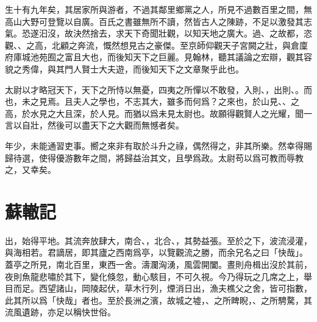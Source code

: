 生十有九{年}矣，其居家所與游者，不過其鄰里鄉黨之人，所見不過數百里之間，無高山大野可登覽以自廣。百氏之書雖無所不讀，然皆古人之陳跡，不足以激發其志氣。恐遂汩沒，故決然捨去，求天下奇聞壯觀，以知天地之廣大。過、之故都，恣觀、、之高，北顧之奔流，慨然想見古之豪傑。至京師仰觀天子宮闕之壯，與倉廩府庫城池苑囿之富且大也，而後知天下之巨麗。見翰林，聽其議論之宏辯，觀其容貌之秀偉，與其門人賢士大夫遊，而後知天下之文章聚乎此也。%

太尉以才略冠天下，天下之所恃以無憂，四夷之所憚以不敢發，入則、，出則、。而也，未之見焉。且夫人之學也，不志其大，雖多而何爲？之來也，於山見、、之高，於水見之大且深，於人見。而猶以爲未見太尉也。故願得觀賢人之光耀，聞一言以自壯，然後可以盡天下之大觀而無憾者矣。

年少，未能通習吏事。嚮之來非有取於斗升之祿，偶然得之，非其所樂。然幸得賜歸待選，使得優游數年之間，將{歸}益治其文，且學爲政。太尉苟以爲可教而辱教之，又幸矣。%
\nopagebreak
\theendnotes

\section[黃州快哉亭記\quad{\small 蘇轍}]{{\normalsize 蘇轍}\quad {}記}
出，始得平地。其流奔放肆大，南合、，北合、，其勢益張。至於之下，波流浸灌，與海相若。君謫居，即其廬之西南爲亭，以覽觀流之勝，而余兄名之曰「快哉」。蓋亭之所見，南北百里，東西一舍。濤瀾洶湧，風雲開闔。晝則舟楫出沒於其前，夜則魚龍悲嘯於其下，變化倏忽，動心駭目，不可久視。今乃得玩之几席之上，舉目而足。西望諸山，岡陵起伏，草木行列，煙消日出，漁夫樵父之舍，皆可指數，此其所以爲「快哉」者也。至於長洲之濱，故城之墟，、之所睥睨，、之所騁騖，其{流風}遺跡，亦足以稱快世俗。%

